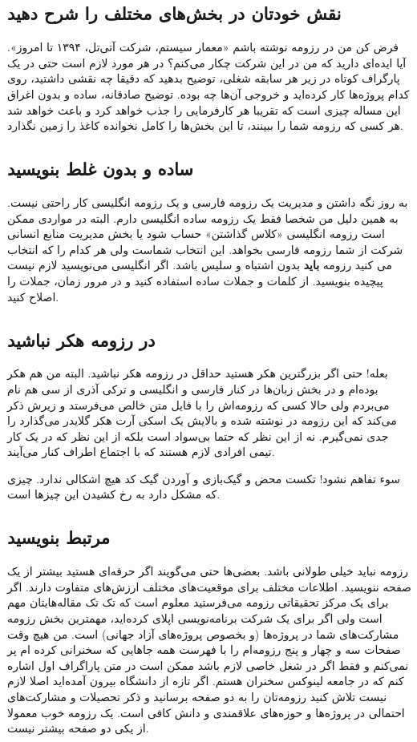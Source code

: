 \subsection*{نقش خودتان در بخش‌های مختلف را شرح دهید}
فرض کن من در رزومه نوشته باشم «معمار سیستم، شرکت آتی‌تل، ۱۳۹۴ تا امروز». آیا ایده‌ای دارید که من در این شرکت چکار می‌کنم؟ در هر مورد لازم است حتی در یک پارگراف کوتاه در زیر هر سابقه شغلی، توضیح بدهید که دقیقا چه نقشی داشتید، روی کدام پروژه‌ها کار کرده‌اید و خروجی‌ آن‌ها چه بوده. توضیح صادقانه، ساده و بدون اغراق این مساله چیزی است که تقریبا هر کارفرمایی را جذب خواهد کرد و باعث خواهد شد هر کسی که رزومه شما را ببینند، تا این بخش‌ها را کامل نخوانده کاغذ را زمین نگذارد.
\subsection*{ساده و بدون غلط بنویسید}
به روز نگه داشتن و مدیریت یک رزومه فارسی و یک رزومه انگلیسی کار راحتی نیست. به همین دلیل من شخصا فقط یک رزومه ساده انگلیسی دارم. البته در مواردی ممکن است رزومه انگلیسی «کلاس گذاشتن» حساب شود یا بخش مدیریت منابع انسانی شرکت از شما رزومه فارسی بخواهد. این انتخاب شماست ولی هر کدام را که انتخاب می کنید رزومه
\textbf{باید}
بدون اشتباه و سلیس باشد. اگر انگلیسی می‌نویسید لازم نیست پیچیده بنویسید. از کلمات و جملات ساده استفاده کنید و در مرور زمان، جملات را اصلاح کنید.
\subsection*{در رزومه هکر نباشید}
بعله! حتی اگر بزرگترین هکر هستید حداقل در رزومه هکر نباشید. البته من هم هکر بوده‌ام و در بخش زبان‌ها در کنار فارسی و انگلیسی و ترکی آذری از سی هم نام می‌بردم ولی حالا کسی که رزومه‌اش را با فایل متن خالص می‌فرستد و زیرش ذکر می‌کند که این رزومه در
نوشته شده و بالایش یک اسکی آرت هکر گلایدر می‌گذارد را جدی نمی‌گیرم. نه از این نظر که حتما بی‌سواد است بلکه از این نظر که در یک کار تیمی افرادی لازم هستند که با اجتماع اطراف کنار می‌آیند.
\begin{mdframed}
سوء تفاهم نشود! تکست محض و گیک‌بازی و آوردن گیک کد هیچ اشکالی ندارد. چیزی که مشکل دارد به رخ کشیدن این چیزها است.
\end{mdframed}
\subsection*{مرتبط بنویسید}
رزومه نباید خیلی طولانی باشد. بعضی‌ها حتی می‌گویند اگر حرفه‌ای هستید بیشتر از یک صفحه ننویسید. اطلاعات مختلف برای موقعیت‌های مختلف ارزش‌های متفاوت دارند. اگر برای یک مرکز تحقیقاتی رزومه می‌فرستید معلوم است که تک تک مقاله‌هایتان مهم است ولی اگر برای یک شرکت برنامه‌نویسی اپلای کرده‌اید، مهمترین بخش رزومه مشارکت‌های شما در پروژه‌ها (و بخصوص پروژه‌های‌ آزاد جهانی) است. من هیچ وقت صفحات سه و چهار و پنج رزومه‌ام را با فهرست همه جاهایی که سخنرانی کرده ام پر نمی‌کنم و فقط اگر در شغل خاصی لازم باشد ممکن است در متن پاراگراف اول اشاره کنم که در جامعه لینوکس سخنران هستم. اگر تازه از دانشگاه بیرون آمده‌اید اصلا لازم نیست تلاش کنید رزومه‌تان را به دو صفحه برسانید و ذکر تحصیلات و مشارکت‌های احتمالی در پروژه‌ها و حوزه‌های علاقمندی و دانش کافی است. یک رزومه خوب معمولا از یکی دو صفحه بیشتر نیست.
